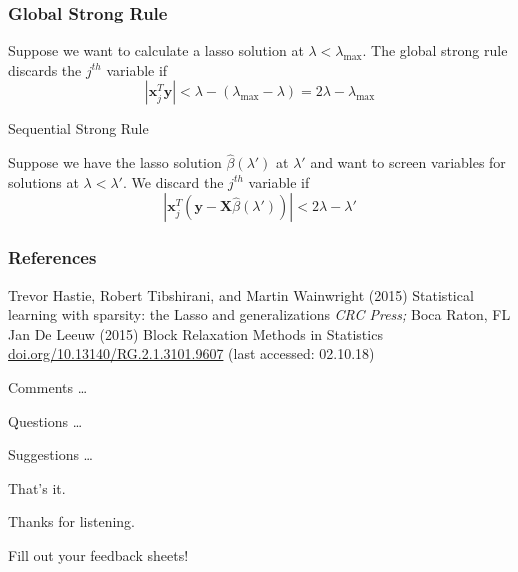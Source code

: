 \documentclass{beamer}
\newcommand{\norm}[1]{\left\lvert#1\right\rvert}
\begin{document}
\begin{frame}
\frametitle{Global Strong Rule}
Suppose we want to calculate a lasso solution at $\lambda<\lambda_{\max}$. The global strong rule discards the $j^{th}$ variable if 
\[\norm{\mathbf{x}_j^T\mathbf{y}}<\lambda-(\lambda_{\max}-\lambda)=2\lambda-\lambda_{\max}\]

\vspace{5pt}
{\hspace{5pt}\Large Sequential Strong Rule}
\vspace{15pt}

Suppose we have the lasso solution $\hat\beta(\lambda')$ at $\lambda'$ and want to screen variables for solutions at $\lambda<\lambda'$. We discard the $j^{th}$ variable if 
\[\norm{\mathbf{x}_j^T(\mathbf{y}-\mathbf{X}\hat{\beta}(\lambda'))}<2\lambda-\lambda'\]
\end{frame}

\begin{frame}
\frametitle{References}
\footnotesize{
\begin{thebibliography}{99} %
 Trevor Hastie, Robert Tibshirani, and Martin Wainwright (2015)
\newblock Statistical learning with sparsity: the Lasso and
generalizations
\newblock \emph{CRC Press;} Boca Raton, FL%
 Jan De Leeuw (2015)
\newblock Block Relaxation Methods in Statistics
\newblock \url{doi.org/10.13140/RG.2.1.3101.9607} (last accessed: 02.10.18)
\end{thebibliography}
}
\end{frame}

\begin{frame}
\Huge{\centerline{Comments \dots}}
\Huge{\centerline{Questions \dots}}
\Huge{\centerline{Suggestions \dots}}
\end{frame}


\begin{frame}
\Huge{\centerline{That's it.}}
\Huge{\centerline{Thanks for listening.}}
\vspace{20pt}
\large{\centerline{Fill out your feedback sheets!}}
\end{frame}
\end{document}
